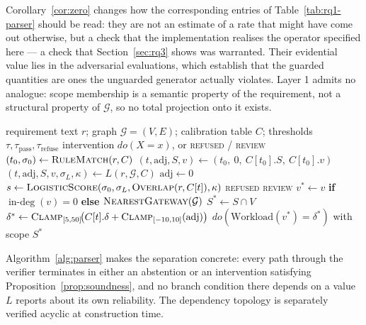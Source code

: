 \documentclass[journal, 10pt]{IEEEtran}
\begin{document}
Corollary~\ref{cor:zero} changes how the corresponding entries of
Table~\ref{tab:rq1-parser} should be read: they are not an estimate of a rate that might
have come out otherwise, but a check that the implementation realises the
operator specified here --- a check that Section~\ref{sec:rq3} shows was
warranted. Their evidential value lies in the adversarial evaluations, which
establish that the guarded quantities are ones the unguarded generator actually
violates. Layer 1 admits no analogue: scope membership is a semantic property of
the requirement, not a structural property of $\mathcal{G}$, so no total
projection onto it exists.

\begin{algorithm}[!t]
\caption{Guarded requirement parsing. Lines 2--10 are the non-deterministic generator; lines 11--18 are the deterministic verifier, which reads no confidence signal produced by $L$.}
\label{alg:parser}
\begin{algorithmic}[1]
\REQUIRE requirement text $r$; graph $\mathcal{G}=(V,E)$; calibration table $C$; thresholds $\tau, \tau_{\text{pass}}, \tau_{\text{refuse}}$
\ENSURE intervention $do(X{=}x)$, or \textsc{refused} / \textsc{review}
\STATE $(t_0, \sigma_0) \leftarrow \textsc{RuleMatch}(r, C)$ 
\IF{$\sigma_0 \geq \tau$}
    \STATE $(t,\text{adj},S,v) \leftarrow (t_0,\ 0,\ C[t_0].S,\ C[t_0].v)$ 
\ELSE
    \STATE $(t,\text{adj},S,v,\sigma_L,\kappa) \leftarrow L(r,\mathcal{G},C)$ 
        \STATE $\text{adj} \leftarrow 0$ 
    \ENDIF
\ENDIF
\STATE $s \leftarrow \textsc{LogisticScore}(\sigma_0, \sigma_L, \textsc{Overlap}(r, C[t]), \kappa)$
 \RETURN \textsc{refused}
 \RETURN \textsc{review}
\ENDIF
\STATE $v^{*} \leftarrow v$ \textbf{if} $\operatorname{in-deg}(v){=}0$ \textbf{else} $\textsc{NearestGateway}(\mathcal{G})$
\STATE $S^{*} \leftarrow S \cap V$
\STATE $\delta^{*} \leftarrow \textsc{Clamp}_{[5,50]}\!\big(C[t].\delta + \textsc{Clamp}_{[-10,10]}(\text{adj})\big)$
\RETURN $do(\text{Workload}(v^{*}){=}\delta^{*})$ with scope $S^{*}$
\end{algorithmic}
\end{algorithm}

Algorithm~\ref{alg:parser} makes the separation concrete: every path through the
verifier terminates in either an abstention or an intervention satisfying
Proposition~\ref{prop:soundness}, and no branch condition there depends on a
value $L$ reports about its own reliability. The dependency topology is separately
verified acyclic at construction time.
\end{document}
